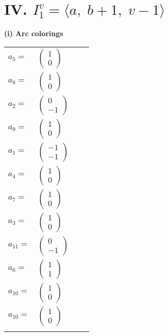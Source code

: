 \documentclass[1p]{elsarticle_modified}
\theoremstyle{definition}
\begin{document}
\centering \section*{IV. $I^v_{1}= \langle a,\;b+1,\;v-1 \rangle$}
\flushleft \textbf{(i) Arc colorings}\\
\begin{tabular}{m{7pt} m{180pt} m{7pt} m{180pt} }
\flushright $a_{5}=$&$\begin{pmatrix}1\\0\end{pmatrix}$ \\
\flushright $a_{8}=$&$\begin{pmatrix}1\\0\end{pmatrix}$ \\
\flushright $a_{2}=$&$\begin{pmatrix}0\\-1\end{pmatrix}$ \\
\flushright $a_{9}=$&$\begin{pmatrix}1\\0\end{pmatrix}$ \\
\flushright $a_{1}=$&$\begin{pmatrix}-1\\-1\end{pmatrix}$ \\
\flushright $a_{4}=$&$\begin{pmatrix}1\\0\end{pmatrix}$ \\
\flushright $a_{7}=$&$\begin{pmatrix}1\\0\end{pmatrix}$ \\
\flushright $a_{3}=$&$\begin{pmatrix}1\\0\end{pmatrix}$ \\
\flushright $a_{11}=$&$\begin{pmatrix}0\\-1\end{pmatrix}$ \\
\flushright $a_{6}=$&$\begin{pmatrix}1\\1\end{pmatrix}$ \\
\flushright $a_{10}=$&$\begin{pmatrix}1\\0\end{pmatrix}$\\ \flushright $a_{10}=$&$\begin{pmatrix}1\\0\end{pmatrix}$\\&\end{tabular}
\end{document}
